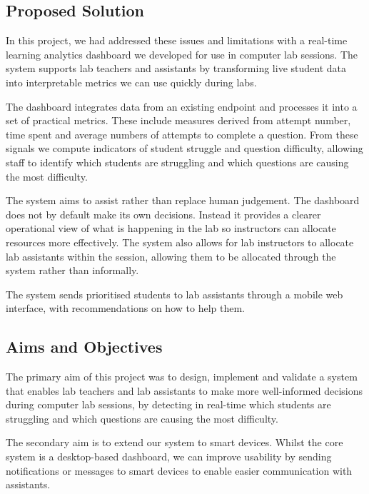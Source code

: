 \subsection{Proposed Solution}


In this project, we had addressed these issues and limitations with a real-time learning analytics dashboard we developed for use in computer lab sessions.
The system supports lab teachers and assistants by transforming live student data into interpretable metrics we can use quickly during labs.


The dashboard integrates data from an existing endpoint and processes it into a set of practical metrics.
These include measures derived from attempt number, time spent and average numbers of attempts to complete a question.
From these signals we compute indicators of student struggle and question difficulty, allowing staff to identify which students are struggling and which questions are causing the most difficulty.

The system aims to assist rather than replace human judgement.
The dashboard does not by default make its own decisions.
Instead it provides a clearer operational view of what is happening in the lab so instructors can allocate resources more effectively.
The system also allows for lab instructors to allocate lab assistants within the session, allowing them to be allocated through the system rather than informally.

The system sends prioritised students to lab assistants through a mobile web interface, with recommendations on how to help them.
\subsection{Aims and Objectives}


The primary aim of this project was to design, implement and validate a system that enables lab teachers and lab assistants to make more well-informed decisions during computer lab sessions, by detecting in real-time which students are struggling and which questions are causing the most difficulty.


The secondary aim is to extend our system to smart devices. Whilst the core system is a desktop-based dashboard, we can improve usability by sending notifications or messages to smart devices to enable easier communication with assistants.

